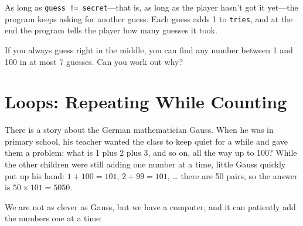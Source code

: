 
\inputminted[linenos=false]{text}{code/en/ch02/out/guess.txt}

As long as \texttt{guess != secret}---that is, as long as the player hasn't got it yet---the program keeps asking for another guess. Each guess adds 1 to \texttt{tries}, and at the end the program tells the player how many guesses it took.

If you always guess right in the middle, you can find any number between 1 and 100 in at most 7 guesses. Can you work out why?

\section{\texorpdfstring{}{for} Loops: Repeating While Counting}
\label{sec:for}

There is a story about the German mathematician Gauss. When he was in primary school, his teacher wanted the class to keep quiet for a while and gave them a problem: what is 1 plus 2 plus 3, and so on, all the way up to 100? While the other children were still adding one number at a time, little Gauss quickly put up his hand: $1 + 100 = 101$, $2 + 99 = 101$, \ldots{} there are 50 pairs, so the answer is $50 \times 101 = 5050$.

\begin{center}
\end{center}

We are not as clever as Gauss, but we have a computer, and it can patiently add the numbers one at a time:


\inputminted[linenos=false]{text}{code/en/ch02/out/sum.txt}

